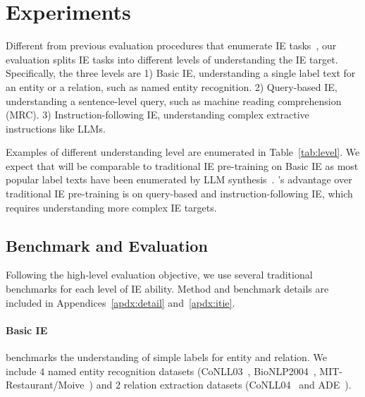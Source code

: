 \section{Experiments}

\begin{table}
\centering
\small
{}
\caption{IE targets of different understanding levels.} 
\vspace{-5mm}
\label{tab:level}
\end{table}

Different from previous evaluation procedures that enumerate IE tasks~\citep{UIE,tanl,metaie}, our evaluation splits IE tasks into different levels of understanding the IE target. Specifically, the three levels are 1) Basic IE, understanding a single label text for an entity or a relation, such as named entity recognition. 2) Query-based IE, understanding a sentence-level query, such as machine reading comprehension (MRC). 3) Instruction-following IE, understanding complex extractive instructions like LLMs.

Examples of different understanding level are enumerated in Table~\ref{tab:level}. We expect that \our will be comparable to traditional IE pre-training on Basic IE as most popular label texts have been enumerated by LLM synthesis~\citep{NuNER,metaie}. \our's advantage over traditional IE pre-training is on query-based and instruction-following IE, which requires understanding more complex IE targets.

\subsection{Benchmark and Evaluation}

Following the high-level evaluation objective, we use several traditional benchmarks for each level of IE ability. Method and benchmark details are included in Appendices~\ref{apdx:detail} and~\ref{apdx:itie}.

\paragraph{Basic IE} benchmarks the understanding of simple labels for entity and relation. We include $4$ named entity recognition datasets (CoNLL03~\citep{conll2003}, BioNLP2004~\citep{bionlp2004}, MIT-Restaurant/Moive~\citep{tner}) and $2$ relation extraction datasets (CoNLL04~\citep{conll2004} and ADE~\citep{ADE}).

